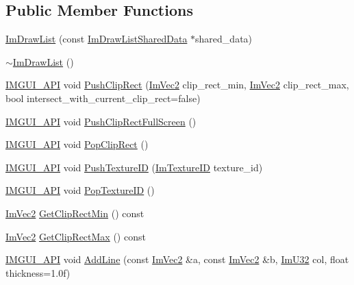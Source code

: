 \subsection*{Public Member Functions}
\begin{DoxyCompactItemize}
\item 
\mbox{\hyperlink{struct_im_draw_list_a7c2af665f2c3e3bb5fc8aa34ef6dac91}{Im\+Draw\+List}} (const \mbox{\hyperlink{struct_im_draw_list_shared_data}{Im\+Draw\+List\+Shared\+Data}} $\ast$shared\+\_\+data)
\item 
\mbox{\hyperlink{struct_im_draw_list_a19fd8d920c202cf8ba5f5c55c43d1d2a}{$\sim$\+Im\+Draw\+List}} ()
\item 
\mbox{\hyperlink{imgui_8h_a43829975e84e45d1149597467a14bbf5}{I\+M\+G\+U\+I\+\_\+\+A\+PI}} void \mbox{\hyperlink{struct_im_draw_list_acb34e2d3708616cae4567f3b4af06962}{Push\+Clip\+Rect}} (\mbox{\hyperlink{struct_im_vec2}{Im\+Vec2}} clip\+\_\+rect\+\_\+min, \mbox{\hyperlink{struct_im_vec2}{Im\+Vec2}} clip\+\_\+rect\+\_\+max, bool intersect\+\_\+with\+\_\+current\+\_\+clip\+\_\+rect=false)
\item 
\mbox{\hyperlink{imgui_8h_a43829975e84e45d1149597467a14bbf5}{I\+M\+G\+U\+I\+\_\+\+A\+PI}} void \mbox{\hyperlink{struct_im_draw_list_a0ab1ab409f0e269755e50a77901bae39}{Push\+Clip\+Rect\+Full\+Screen}} ()
\item 
\mbox{\hyperlink{imgui_8h_a43829975e84e45d1149597467a14bbf5}{I\+M\+G\+U\+I\+\_\+\+A\+PI}} void \mbox{\hyperlink{struct_im_draw_list_a44f40c59ca755f559020f5a7fa81103a}{Pop\+Clip\+Rect}} ()
\item 
\mbox{\hyperlink{imgui_8h_a43829975e84e45d1149597467a14bbf5}{I\+M\+G\+U\+I\+\_\+\+A\+PI}} void \mbox{\hyperlink{struct_im_draw_list_a7ac41e329a9df911b4823ef0150cee16}{Push\+Texture\+ID}} (\mbox{\hyperlink{imgui_8h_a364f4447ecbc4ca176145ccff9db6286}{Im\+Texture\+ID}} texture\+\_\+id)
\item 
\mbox{\hyperlink{imgui_8h_a43829975e84e45d1149597467a14bbf5}{I\+M\+G\+U\+I\+\_\+\+A\+PI}} void \mbox{\hyperlink{struct_im_draw_list_ade9286c5ca58753f7bd571b30e2ff76c}{Pop\+Texture\+ID}} ()
\item 
\mbox{\hyperlink{struct_im_vec2}{Im\+Vec2}} \mbox{\hyperlink{struct_im_draw_list_a9d83896d3eb434a9e1072d56523a2754}{Get\+Clip\+Rect\+Min}} () const
\item 
\mbox{\hyperlink{struct_im_vec2}{Im\+Vec2}} \mbox{\hyperlink{struct_im_draw_list_a8e484a61eab501c1c1c416a8b45bb08e}{Get\+Clip\+Rect\+Max}} () const
\item 
\mbox{\hyperlink{imgui_8h_a43829975e84e45d1149597467a14bbf5}{I\+M\+G\+U\+I\+\_\+\+A\+PI}} void \mbox{\hyperlink{struct_im_draw_list_a6db76ca2506dc86ad4d602fdcd2e2ea8}{Add\+Line}} (const \mbox{\hyperlink{struct_im_vec2}{Im\+Vec2}} \&a, const \mbox{\hyperlink{struct_im_vec2}{Im\+Vec2}} \&b, \mbox{\hyperlink{imgui_8h_a118cff4eeb8d00e7d07ce3d6460eed36}{Im\+U32}} col, float thickness=1.\+0f)

\end{DoxyCompactItemize}
